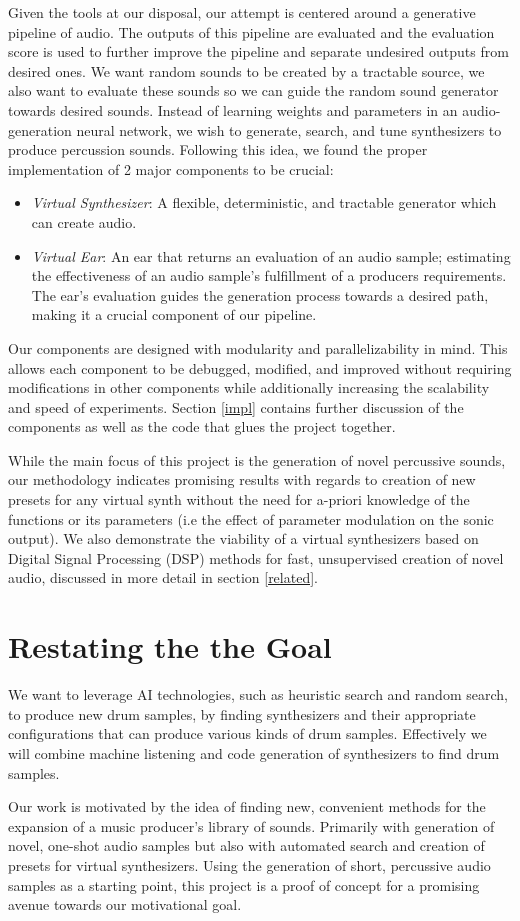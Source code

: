 \documentclass[\main/thesis.tex]{subfiles}
\begin{document}
Given the tools at our disposal, our attempt is centered around a generative pipeline of audio. The outputs of this pipeline are evaluated and the evaluation score is used to further improve the pipeline and separate undesired outputs from desired ones. We want random sounds to be created by a tractable source, we also want to evaluate these sounds so we can guide the random sound generator towards desired sounds. Instead of learning weights and parameters in an audio-generation neural network, we wish to generate, search, and tune synthesizers to produce percussion sounds. Following this idea, we found the proper implementation of 2 major components to be crucial:

\begin{itemize}
    \item \textit{Virtual Synthesizer}: A flexible, deter\-min\-istic, and tract\-able gener\-ator which can create audio. 
    \item \textit{Virtual Ear}: An ear that returns an evaluation of an audio sample; estimating the effectiveness of an audio sample's fulfillment of a producers requirements. The ear's evaluation guides the generation process towards a desired path, making it a crucial component of our pipeline. 
\end{itemize}
Our components are designed with modularity and parallelizability in mind. This allows each component to be debugged, modified, and improved without requiring modifications in other components while additionally increasing the scalability and speed of experiments. 
Section \ref{impl} contains further discussion of the components as well as the code that glues the project together.

While the main focus of this project is the generation of novel percussive sounds, our methodology indicates promising results with regards to creation of new presets for any virtual synth without the need for a-priori knowledge of the functions or its parameters (i.e the effect of parameter modulation on the sonic output). We also demonstrate the viability of a virtual synthesizers based on Digital Signal Processing (DSP) methods for fast, unsupervised creation of novel audio, discussed in more detail in section \ref{related}. 


\section{Restating the the Goal}
We want to leverage AI technologies, such as heuristic search and random search, to produce new drum samples, by finding synthesizers and their appropriate configurations that can produce various kinds of drum samples. Effectively we will combine machine listening and code generation of synthesizers to find drum samples.

Our work is motivated by the idea of finding new, convenient methods for the expansion of a music producer's library of sounds. Primarily with generation of novel, one-shot audio samples but also with automated search and creation of presets for virtual synthesizers. Using the generation of short, percussive audio samples as a starting point, this project is a proof of concept for a promising avenue towards our motivational goal.
\end{document}
